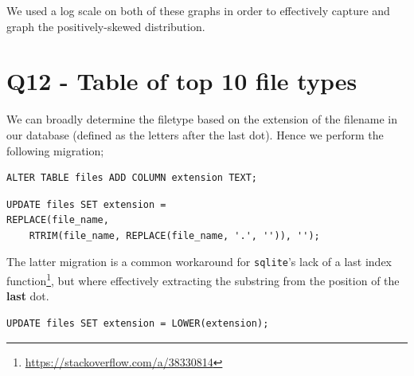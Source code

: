 \documentclass{article}
\begin{document}
We used a log scale on both of these graphs in order to effectively capture and graph the positively-skewed distribution.

\section*{Q12 - Table of top 10 file types}
We can broadly determine the filetype based on the extension of the filename in our database (defined as the letters after the last dot). Hence we perform the following migration;

\begin{small}
\begin{verbatim}
ALTER TABLE files ADD COLUMN extension TEXT;
\end{verbatim}
\end{small}

\begin{small}
\begin{verbatim}
UPDATE files SET extension = 
REPLACE(file_name,
    RTRIM(file_name, REPLACE(file_name, '.', '')), '');
\end{verbatim}
\end{small}

The latter migration is a common workaround for \texttt{sqlite}'s lack of a last index function\footnote{\url{https://stackoverflow.com/a/38330814}}, but where effectively extracting the substring from the position of the \textbf{last} dot.

\begin{small}
\begin{verbatim}
UPDATE files SET extension = LOWER(extension);
\end{verbatim}
\end{small}

\newpage
\end{document}

